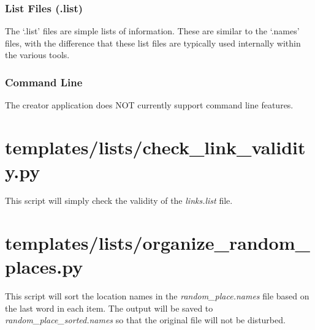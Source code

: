 \subsubsection{List Files (.list) \label{section .list}}

The `.list' files are simple lists of information. These are similar to the `.names' files, with the difference that these list files are typically used internally within the various tools.













\subsubsection{Command Line}

The creator application does NOT currently support command line features.



















\section{templates/lists/check\_link\_validity.py}


This script will simply check the validity of the \textit{links.list} file.












\section{templates/lists/organize\_random\_places.py}

This script will sort the location names in the \textit{random\_place.names} file based on the last word in each item. The output will be saved to \textit{random\_place\_sorted.names} so that the original file will not be disturbed.














